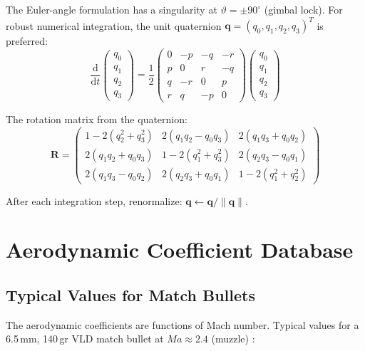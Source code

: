 \documentclass[11pt,twoside,openright]{report}
\newcommand{\dd}{\mathrm{d}}
\newcommand{\Mach}{\mathit{Ma}}
\begin{document}
The Euler-angle formulation has a singularity at $\vartheta = \pm 90^{\circ}$ (gimbal lock). For robust numerical integration, the unit quaternion $\bm{q} = (q_0, q_1, q_2, q_3)^T$ is preferred:
\begin{equation}
  \frac{\dd}{\dd t}\begin{pmatrix}q_0\\q_1\\q_2\\q_3\end{pmatrix}
  = \frac{1}{2}\begin{pmatrix}
    0 & -p & -q & -r\\
    p &  0 &  r & -q\\
    q & -r &  0 &  p\\
    r &  q & -p &  0
  \end{pmatrix}
  \begin{pmatrix}q_0\\q_1\\q_2\\q_3\end{pmatrix}
  \label{eq:quat_ode}
\end{equation}

The rotation matrix from the quaternion:
\begin{equation}
  \bm{R} = \begin{pmatrix}
    1-2(q_2^2+q_3^2) & 2(q_1 q_2 - q_0 q_3) & 2(q_1 q_3 + q_0 q_2)\\
    2(q_1 q_2 + q_0 q_3) & 1-2(q_1^2+q_3^2) & 2(q_2 q_3 - q_0 q_1)\\
    2(q_1 q_3 - q_0 q_2) & 2(q_2 q_3 + q_0 q_1) & 1-2(q_1^2+q_2^2)
  \end{pmatrix}
  \label{eq:quat_to_R}
\end{equation}

After each integration step, renormalize: $\bm{q} \leftarrow \bm{q}/\|\bm{q}\|$.

\section{Aerodynamic Coefficient Database}

\subsection{Typical Values for Match Bullets}

The aerodynamic coefficients are functions of Mach number. Typical values for a 6.5\,mm, 140\,gr VLD match bullet at $\Mach \approx 2.4$ (muzzle) \citep{mccoy1999modern, carlucci2007ballistics}:
\end{document}
